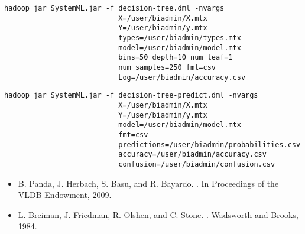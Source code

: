 \begin{verbatim}
hadoop jar SystemML.jar -f decision-tree.dml -nvargs 
                           X=/user/biadmin/X.mtx 
                           Y=/user/biadmin/y.mtx 
                           types=/user/biadmin/types.mtx
                           model=/user/biadmin/model.mtx
                           bins=50 depth=10 num_leaf=1
                           num_samples=250 fmt=csv
                           Log=/user/biadmin/accuracy.csv
\end{verbatim}

\begin{verbatim}
hadoop jar SystemML.jar -f decision-tree-predict.dml -nvargs 
                           X=/user/biadmin/X.mtx 
                           Y=/user/biadmin/y.mtx 
                           model=/user/biadmin/model.mtx
                           fmt=csv
                           predictions=/user/biadmin/probabilities.csv
                           accuracy=/user/biadmin/accuracy.csv
                           confusion=/user/biadmin/confusion.csv
\end{verbatim}


\begin{itemize}
\item B. Panda, J. Herbach, S. Basu, and R. Bayardo. . In Proceedings of the VLDB Endowment, 2009.
\item L. Breiman, J. Friedman, R. Olshen, and C. Stone. . Wadsworth and Brooks, 1984.
\end{itemize}
